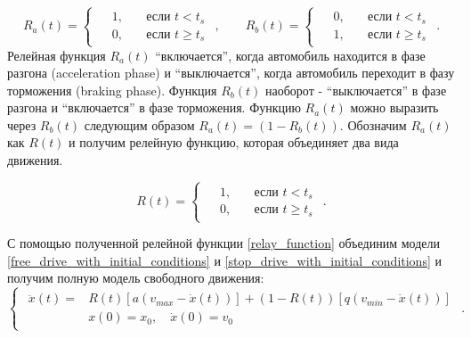 \documentclass[12pt, a4paper]{extarticle}
\numberwithin{equation}{section}
\begin{document}
\begin{equation*} 
R_{a}(t)=
\begin{cases}
\begin{split}
&1, \quad&\text{если } t<t_{s} \\
&0, \quad&\text{если } t\geq t_{s}
\end{split}
\end{cases},
\qquad
R_{b}(t)=
\begin{cases}
\begin{split}
&0, \quad&\text{если } t<t_{s} \\
&1, \quad&\text{если } t\geq t_{s}
\end{split}
\end{cases}.
\end{equation*}
Релейная функция $R_{a}(t)$ ``включается'', когда автомобиль находится в фазе разгона (acceleration phase) и ``выключается'', когда автомобиль переходит в фазу торможения (braking phase). Функция $R_{b}(t)$ наоборот - ``выключается'' в фазе разгона и ``включается'' в фазе торможения. Функцию $R_{a}(t)$ можно выразить через $R_{b}(t)$ следующим образом $R_{a}(t) = (1-R_{b}(t))$. Обозначим $R_{a}(t)$ как $R(t)$ и получим релейную функцию, которая объединяет два вида движения.

\begin{equation} \label{relay_function}
R(t)=
\begin{cases}
\begin{split}
&1, \quad&\text{если } t<t_{s} \\
&0, \quad&\text{если } t\geq t_{s}
\end{split}
\end{cases}.
\end{equation}

С помощью полученной релейной функции \eqref{relay_function} объединим модели \eqref{free_drive_with_initial_conditions} и  \eqref{stop_drive_with_initial_conditions} и получим полную модель свободного движения:
\begin{equation} \label{free_drive_model}
\begin{cases}
\begin{split}
\ddot{x}(t) = &R(t) \left[ a\left(v_{max}-\dot{x}(t) \right)\right] + (1-R(t)) \left[ q\left( v_{min} - \dot{x}(t)\right) \right]  \\
&x(0)=x_0, \quad \dot{x}(0)=v_{0}
\end{split}
\end{cases}.
\end{equation}
\end{document}

